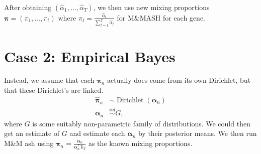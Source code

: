 \documentclass[11pt,authoryear]{article}
\DeclareMathOperator*{\dir}{Dirichlet}
\newcommand{\bs}[1]{\boldsymbol{#1}}
\begin{document}
After obtaining $(\hat{\alpha}_1,\ldots,\hat{\alpha}_T)$, we then use
new mixing proportions $\bs{\pi} = (\pi_1,\ldots,\pi_t)$ where $\pi_t
= \frac{\hat{\alpha}_{t}}{\sum_{t = 1}^T\hat{\alpha}_t}$ for M\&MASH
for each gene.

\section{Case 2: Empirical Bayes}
Instead, we assume that each $\bs{\pi}_n$ actually does come from its
own Dirichlet, but that these Dirichlet's are linked.
\begin{align}
\hat{\bs{\pi}}_n &\sim \dir(\bs{\alpha}_n)\\
\bs{\alpha}_n &\overset{iid}{\sim} G,
\end{align}
where $G$ is some suitably non-parametric family of distributions. We
could then get an estimate of $G$ and estimate each $\bs{\alpha}_n$ by
their posterior means. We then run M\&M ash using $\bs{\pi}_n =
\frac{\bs{\alpha}_n}{\bs{\alpha}_n^{\intercal}\bs{1}_T}$ as the known
mixing proportions.


\end{document}
